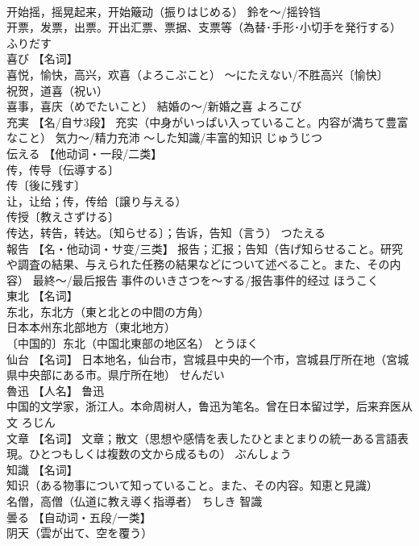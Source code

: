 \documentclass[8pt]{extreport}
\begin{document}
\begin{CJK}{UTF8}{min}
\\	开始摇，摇晃起来，开始簸动（振りはじめる） 鈴を～/摇铃铛 
\\	开票，发票，出票。开出汇票、票据、支票等（為替･手形･小切手を発行する）	ふりだす	
\\	喜び	【名词】 
\\	喜悦，愉快，高兴，欢喜（よろこぶこと） ～にたえない/不胜高兴〔愉快〕 
\\	祝贺，道喜（祝い） 
\\	喜事，喜庆（めでたいこと） 結婚の～/新婚之喜	よろこび	
\\	充実	【名/自サ3段】 充实（中身がいっぱい入っていること。内容が満ちて豊富なこと） 気力～/精力充沛 ～した知識/丰富的知识	じゅうじつ	
\\	伝える	【他动词・一段/二类】 
\\	传，传导〔伝導する〕 
\\	传〔後に残す〕 
\\	让，让给；传，传给〔譲り与える） 
\\	传授〔教えさずける〕 
\\	传达，转告，转达。〔知らせる〕；告诉，告知（言う）	つたえる	
\\	報告	【名・他动词・サ变/三类】 报告；汇报；告知（告げ知らせること。研究や調査の結果、与えられた任務の結果などについて述べること。また、その内容） 最終～/最后报告 事件のいきさつを～する/报告事件的经过	ほうこく	
\\	東北	【名词】 
\\	东北，东北方（東と北との中間の方角） 
\\	日本本州东北部地方（東北地方） 
\\	〔中国的〕东北（中国北東部の地区名）	とうほく	
\\	仙台	【名词】 日本地名，仙台市，宫城县中央的一个市，宫城县厅所在地（宮城県中央部にある市。県庁所在地）	せんだい	
\\	魯迅	【人名】 鲁迅
\\	中国的文学家，浙江人。本命周树人，鲁迅为笔名。曾在日本留过学，后来弃医从文	ろじん	
\\	文章	【名词】 文章；散文（思想や感情を表したひとまとまりの統一ある言語表現。ひとつもしくは複数の文から成るもの）	ぶんしょう	
\\	知識	【名词】 
\\	知识（ある物事について知っていること。また、その内容。知恵と見識） 
\\	名僧，高僧（仏道に教え導く指導者）	ちしき	智識
\\	曇る	【自动词・五段/一类】 
\\	阴天（雲が出て、空を覆う） 

\end{CJK}
\end{document}
